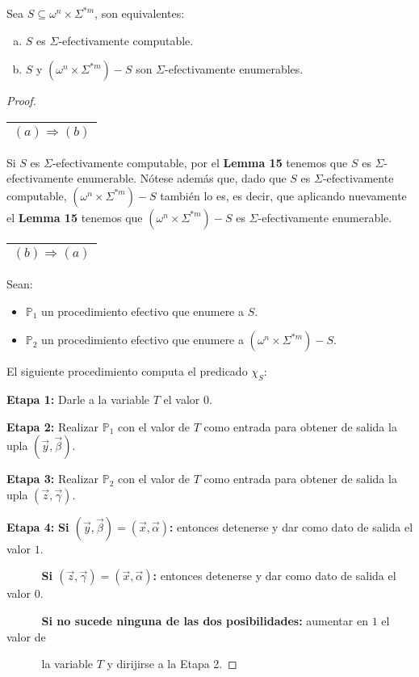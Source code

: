   \begin{theorem}
    \PN Sea $S \subseteq \omega^{n}\times \Sigma^{\ast m}$, son equivalentes:

    \begin{enumerate}[a)]
      \item $S$ es $\Sigma$-efectivamente computable.
      \item $S$ y $(\omega^{n}\times \Sigma^{\ast m})-S$ son $\Sigma$-efectivamente enumerables.
    \end{enumerate}
  \end{theorem}
  \begin{proof}
    \begin{tabular}{|c|}\hline $(a) \Rightarrow (b)$\\\hline\end{tabular} Si $S$ es $\Sigma$-efectivamente computable,
    por el \textbf{Lemma 15} tenemos que $S$ es $\Sigma$-efectivamente enumerable. Nótese además que, dado que $S$ es
    $\Sigma$-efectivamente computable, $(\omega^{n} \times \Sigma^{\ast m}) - S$ también lo es, es decir, que aplicando
    nuevamente el \textbf{Lemma 15} tenemos que $(\omega^{n} \times \Sigma^{\ast m})-S$ es
    $\Sigma$-efectivamente enumerable.

    \vspace{3mm}
    \PN \begin{tabular}{|c|}\hline $(b) \Rightarrow (a)$\\\hline\end{tabular} Sean:

    \begin{itemize}
      \item $\mathbb{P}_{1}$ un procedimiento efectivo que enumere a $S$.
      \item $\mathbb{P}_{2}$ un procedimiento efectivo que enumere a $(\omega^{n}\times \Sigma^{\ast m}) - S$.
    \end{itemize}

    \PN El siguiente procedimiento computa el predicado $\chi_{S}$:

    \vspace{3mm}
    \PN \textbf{Etapa 1:}
    Darle a la variable $T$ el valor $0$.

    \PN \textbf{Etapa 2:}
    Realizar $\mathbb{P}_{1}$ con el valor de $T$ como entrada para obtener de salida la upla $(\vec{y}, \vec{\beta})$.

    \PN \textbf{Etapa 3:}
    Realizar $\mathbb{P}_{2}$ con el valor de $T$ como entrada para obtener de salida la upla $(\vec{z}, \vec{\gamma})$.

    \PN \textbf{Etapa 4:}
    \textbf{Si $(\vec{y}, \vec{\beta}) = (\vec{x}, \vec{\alpha})$:} entonces detenerse y dar como dato de salida el
    valor $1$.

    $\qquad\;\;\;\;$\textbf{Si $(\vec{z}, \vec{\gamma}) = (\vec{x}, \vec{\alpha})$:} entonces detenerse y dar como
    dato de salida el valor $0$.

    $\qquad\;\;\;\;$\textbf{Si no sucede ninguna de las dos posibilidades:} aumentar en $1$ el valor de

    $\qquad\;\;\;\;$la variable $T$ y dirijirse a la Etapa 2.
  \end{proof}

